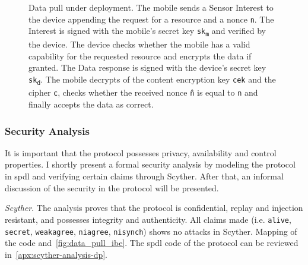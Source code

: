 \begin{figure}[H]
  \caption{Data pull under deployment. 
  The mobile sends a Sensor Interest to the device appending the request for a resource and a nonce \texttt{n}. 
  The Interest is signed with the mobile's secret key \texttt{sk\textsubscript{m}} and verified by the device. 
  The device checks whether the mobile has a valid capability for the requested resource and encrypts the data if granted.
  The Data response is signed with the device's secret key \texttt{sk\textsubscript{d}}.
  The mobile decrypts of the content encryption key \texttt{cek} and the cipher \texttt{c}, checks whether the received nonce \texttt{\^{n}} is equal to \texttt{n} and finally accepts the data as correct.}
  \label{fig:data_pull_ibe}
\end{figure}


\subsubsection{Security Analysis}
It is important that the protocol possesses privacy, availability and control properties. 
I shortly present a formal security analysis by modeling the protocol in \gls{spdl} and verifying certain claims through Scyther.
After that, an informal discussion of the security in the protocol will be presented.

\textit{Scyther}.
The analysis proves that the protocol is confidential, replay and injection resistant, and possesses integrity and authenticity.
All claims made (i.e. \texttt{alive}, \texttt{secret}, \texttt{weakagree}, \texttt{niagree}, \texttt{nisynch}) shows no attacks in Scyther. 
 Mapping of the code and~\autoref{fig:data_pull_ibe}.
The \gls{spdl} code of the protocol can be reviewed in~\autoref{apx:scyther-analysis-dp}.


